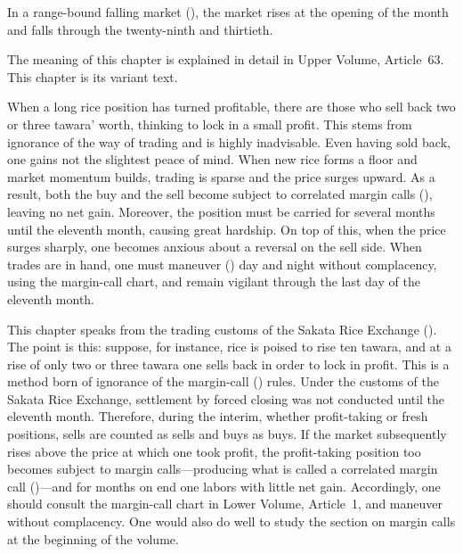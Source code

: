 
\begin{sokyubox}
{\small\itshape\color{sokyubar} }

\medskip
In a range-bound falling market (), the market rises at
the opening of the month and falls through the twenty-ninth and thirtieth.
\end{sokyubox}

\commentary
The meaning of this chapter is explained in detail in Upper Volume,
Article~63. This chapter is its variant text.


\begin{sokyubox}
{\small\itshape\color{sokyubar} }

\medskip
When a long rice position has turned profitable, there are those who sell
back two or three tawara' worth, thinking to lock in a small profit. This
stems from ignorance of the way of trading and is highly inadvisable. Even
having sold back, one gains not the slightest peace of mind. When new rice
forms a floor and market momentum builds, trading is sparse and the price
surges upward. As a result, both the buy and the sell become subject to
correlated margin calls (), leaving no net gain.
Moreover, the position must be carried for several months until the
eleventh month, causing great hardship. On top of this, when the price
surges sharply, one becomes anxious about a reversal on the sell side.
When trades are in hand, one must maneuver () day and
night without complacency, using the margin-call chart, and remain
vigilant through the last day of the eleventh month.
\end{sokyubox}

\commentary
This chapter speaks from the trading customs of the Sakata Rice Exchange
(). The point is this: suppose, for
instance, rice is poised to rise ten tawara, and at a rise of only two or
three tawara one sells back in order to lock in profit. This is a method
born of ignorance of the margin-call () rules. Under
the customs of the Sakata Rice Exchange, settlement by forced closing was
not conducted until the eleventh month. Therefore, during the interim,
whether profit-taking or fresh positions, sells are counted as sells and
buys as buys. If the market subsequently rises above the price at which
one took profit, the profit-taking position too becomes subject to margin
calls---producing what is called a correlated margin call
()---and for months on end one labors with little
net gain. Accordingly, one should consult the margin-call chart in Lower
Volume, Article~1, and maneuver without complacency. One would also do
well to study the section on margin calls at the beginning of the volume.

